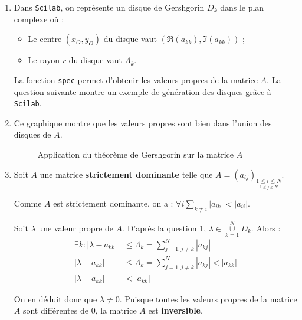 \documentclass[a4paper,11pt]{article}
\theoremstyle{nonumberplain}
\theoremstyle{nonumberplain}
\theoremstyle{nonumberplain}
\begin{document}
\begin{enumerate}
        \item
        Dans \texttt{Scilab}, on représente un disque de Gershgorin $D_{k}$ dans le plan complexe où :
        \begin{itemize}
            \item
            Le centre $(x_{O}, y_{O})$ du disque vaut $(\Re(a_{kk}), \Im(a_{kk}))$ ;

            \item
            Le rayon $r$ du disque vaut $\Lambda_{k}$.
        \end{itemize}

        La fonction \texttt{spec} permet d'obtenir les valeurs propres de la matrice $A$.
        La question suivante montre un exemple de génération des disques grâce à \texttt{Scilab}.

        \item
        Ce graphique montre que les valeurs propres sont bien dans l'union des disques de $A$.
        \begin{figure}[H]
            \centering
            \caption{\label{graph_exo7} Application du théorème de Gershgorin sur la matrice $A$}
        \end{figure}

        \item
        Soit $A$ une matrice \textbf{strictement dominante} telle que $A = (a_{ij})_{\underset {1 \leq j \leq N}{1 \leq i \leq N}}$.

        Comme $A$ est strictement dominante, on a : $\forall i \sum\limits_{k \ne i}^{} |a_{ik}| < |a_{ii}|$.

        Soit $\lambda$ une valeur propre de $A$. D'après la question 1, $\lambda \in \underset{k = 1}{\overset{N}{\cup}} D_{k}$. Alors :
        \begin{equation*}
            \begin{split}
                \exists k : |\lambda - a_{kk}| & \leq \Lambda_{k} = \sum\limits_{j=1, j\ne k}^{N} |a_{kj}| \\
                            |\lambda - a_{kk}| & \leq \Lambda_{k} = \sum\limits_{j=1, j\ne k}^{N} |a_{kj}| < |a_{kk}| \\
                            |\lambda - a_{kk}| & < |a_{kk}|
            \end{split}
        \end{equation*}

        On en déduit donc que $\lambda \ne 0$. Puisque toutes les valeurs propres de la matrice $A$ sont différentes de $0$, la matrice $A$ est \textbf{inversible}.
    \end{enumerate}
\end{document}
